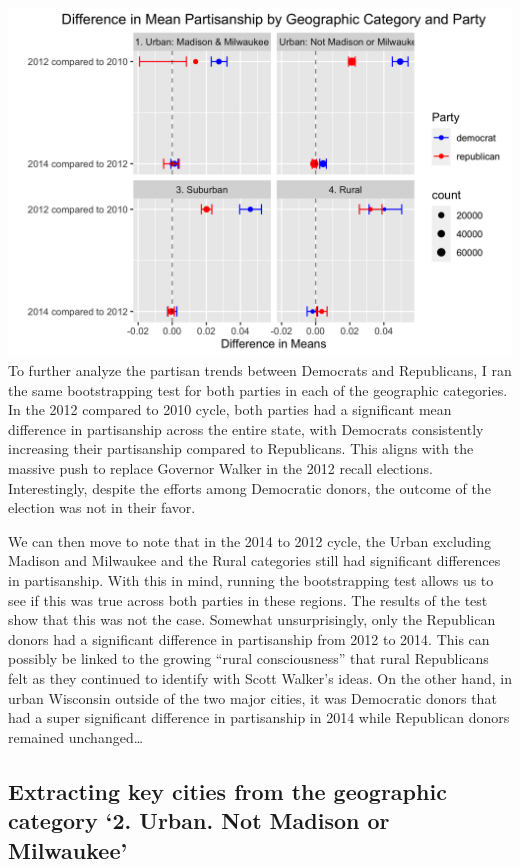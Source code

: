 \documentclass[10pt,]{article}
\begin{document}
\includegraphics{geo_and_parties.png} To further analyze the partisan
trends between Democrats and Republicans, I ran the same bootstrapping
test for both parties in each of the geographic categories. In the 2012
compared to 2010 cycle, both parties had a significant mean difference
in partisanship across the entire state, with Democrats consistently
increasing their partisanship compared to Republicans. This aligns with
the massive push to replace Governor Walker in the 2012 recall
elections. Interestingly, despite the efforts among Democratic donors,
the outcome of the election was not in their favor.

We can then move to note that in the 2014 to 2012 cycle, the Urban
excluding Madison and Milwaukee and the Rural categories still had
significant differences in partisanship. With this in mind, running the
bootstrapping test allows us to see if this was true across both parties
in these regions. The results of the test show that this was not the
case. Somewhat unsurprisingly, only the Republican donors had a
significant difference in partisanship from 2012 to 2014. This can
possibly be linked to the growing ``rural consciousness'' that rural
Republicans felt as they continued to identify with Scott Walker's
ideas. On the other hand, in urban Wisconsin outside of the two major
cities, it was Democratic donors that had a super significant difference
in partisanship in 2014 while Republican donors remained
unchanged\ldots{}

\newpage

\hypertarget{extracting-key-cities-from-the-geographic-category-2.-urban.-not-madison-or-milwaukee}{%
\subsection{Extracting key cities from the geographic category `2.
Urban. Not Madison or
Milwaukee'}\label{extracting-key-cities-from-the-geographic-category-2.-urban.-not-madison-or-milwaukee}}
\end{document}
